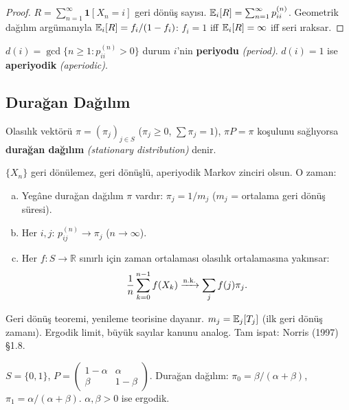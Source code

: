 \begin{proof}
$R = \sum_{n=1}^\infty \mathbf{1}[X_n=i]$ geri dönüş sayısı. $\mathbb{E}_i[R]=\sum_{n=1}^\infty p_{ii}^{(n)}$. Geometrik dağılım argümanıyla $\mathbb{E}_i[R]=f_i/(1-f_i)$: $f_i=1$ iff $\mathbb{E}_i[R]=\infty$ iff seri ıraksar.
\end{proof}

\begin{tanim}[Periyot]\label{def:periyot}
$d(i) = \gcd\{n\geq1: p_{ii}^{(n)}>0\}$ durum $i$'nin \textbf{periyodu} \emph{(period)}. $d(i)=1$ ise \textbf{aperiyodik} \emph{(aperiodic)}.
\end{tanim}

\subsection{Durağan Dağılım}

\begin{tanim}\label{def:duraganlik}
Olasılık vektörü $\pi = (\pi_j)_{j\in S}$ ($\pi_j\geq0$, $\sum\pi_j=1$), $\pi P=\pi$ koşulunu sağlıyorsa \textbf{durağan dağılım} \emph{(stationary distribution)} denir.
\end{tanim}

\begin{teorem}\label{thm:ergodik}
$\{X_n\}$ geri dönülemez, geri dönüşlü, aperiyodik Markov zinciri olsun. O zaman:
\begin{enumerate}[(a)]
  \item Yegâne durağan dağılım $\pi$ vardır: $\pi_j = 1/m_j$ ($m_j$ = ortalama geri dönüş süresi).
  \item Her $i,j$: $p_{ij}^{(n)}\to\pi_j$ ($n\to\infty$).
  \item Her $f:S\to\mathbb{R}$ sınırlı için zaman ortalaması olasılık ortalamasına yakınsar:
  \[
    \frac{1}{n}\sum_{k=0}^{n-1}f(X_k) \xrightarrow{\text{n.k.}} \sum_j f(j)\pi_j.
  \]
\end{enumerate}
\end{teorem}

\begin{ispatiskele}
Geri dönüş teoremi, yenileme teorisine dayanır. $m_j=\mathbb{E}_j[T_j]$ (ilk geri dönüş zamanı). Ergodik limit, büyük sayılar kanunu analog. Tam ispat: Norris (1997) §1.8.
\end{ispatiskele}

\begin{ornek}\label{ex:iki_durumlu}
$S=\{0,1\}$, $P=\begin{pmatrix}1-\alpha&\alpha\\\beta&1-\beta\end{pmatrix}$. Durağan dağılım: $\pi_0=\beta/(\alpha+\beta)$, $\pi_1=\alpha/(\alpha+\beta)$. $\alpha,\beta>0$ ise ergodik.
\end{ornek}


